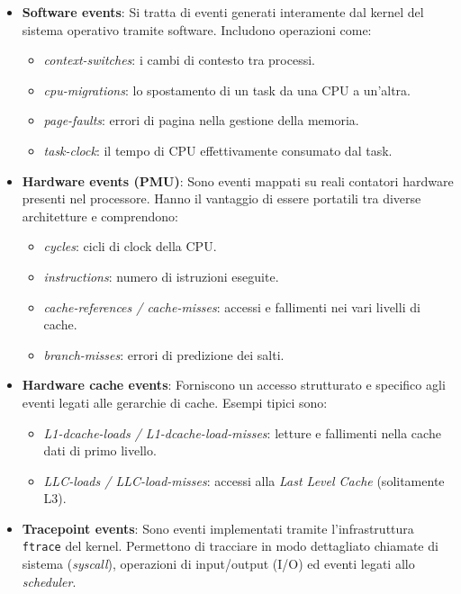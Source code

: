 \begin{itemize}
    \item \textbf{Software events}: Si tratta di eventi generati interamente dal kernel del sistema operativo tramite software. Includono operazioni come:
    \begin{itemize}
        \item \textit{context-switches}: i cambi di contesto tra processi.
        \item \textit{cpu-migrations}: lo spostamento di un task da una CPU a un'altra.
        \item \textit{page-faults}: errori di pagina nella gestione della memoria.
        \item \textit{task-clock}: il tempo di CPU effettivamente consumato dal task.
    \end{itemize}

    \item \textbf{Hardware events (PMU)}: Sono eventi mappati su reali contatori hardware presenti nel processore. Hanno il vantaggio di essere portatili tra diverse architetture e comprendono:
    \begin{itemize}
        \item \textit{cycles}: cicli di clock della CPU.
        \item \textit{instructions}: numero di istruzioni eseguite.
        \item \textit{cache-references / cache-misses}: accessi e fallimenti nei vari livelli di cache.
        \item \textit{branch-misses}: errori di predizione dei salti.
    \end{itemize}

    \item \textbf{Hardware cache events}: Forniscono un accesso strutturato e specifico agli eventi legati alle gerarchie di cache. Esempi tipici sono:
    \begin{itemize}
        \item \textit{L1-dcache-loads / L1-dcache-load-misses}: letture e fallimenti nella cache dati di primo livello.
        \item \textit{LLC-loads / LLC-load-misses}: accessi alla \textit{Last Level Cache} (solitamente L3).
    \end{itemize}

    \item \textbf{Tracepoint events}: Sono eventi implementati tramite l'infrastruttura \texttt{ftrace} del kernel. Permettono di tracciare in modo dettagliato chiamate di sistema (\textit{syscall}), operazioni di input/output (I/O) ed eventi legati allo \textit{scheduler}.
\end{itemize}

